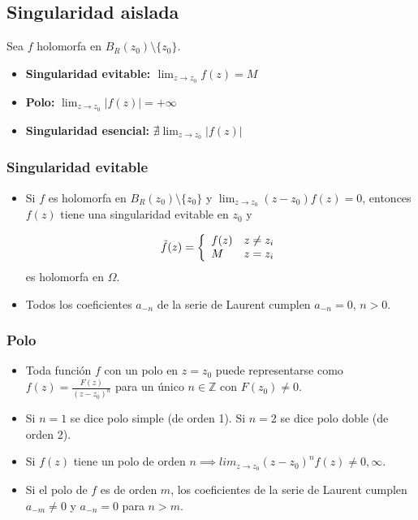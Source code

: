 \documentclass[paper=a4, fontsize=11pt]{scrartcl}
\numberwithin{equation}{section}
\numberwithin{figure}{section}
\numberwithin{table}{section}
\begin{document}
\subsection{Singularidad aislada}

Sea $f$ holomorfa en $B_R(z_0)\setminus\{z_0\}$.

\begin{itemize}

\item \textbf{Singularidad evitable: $\lim_{z\to z_0}f(z) = M$}
\item \textbf{Polo:} $\lim_{z\to z_0}|f(z)| = +\infty$
\item \textbf{Singularidad esencial:} $\nexists \lim_{z\to z_0}\left|f(z)\right|$
\end{itemize}

\subsubsection{Singularidad evitable}
\begin{itemize}
\item Si $f$ es holomorfa en $B_R(z_0)\setminus\{z_0\}$ y $\lim_{z\to z_0} (z-z_0)f(z) = 0$, entonces $f(z)$ tiene una singularidad evitable en $z_0$ y

$$ \tilde{f}(z) =
\left\{
\begin{array}{l l}
f(z) & z\neq z_i\\
M  & z=z_i
\end{array}
\right.$$
es holomorfa en $\Omega$.

\item Todos los coeficientes $a_{-n}$ de la serie de Laurent cumplen $a_{-n}=0$, $n>0$.
\end{itemize}


\subsubsection{Polo}
\begin{itemize}
\item Toda función $f$ con un polo en $z=z_0$ puede representarse como $f(z) = \frac{F(z)}{(z-z_0)^n}$ para un único $n\in \mathbb{Z}$ con $F(z_0)\neq 0$.

\item Si $n=1$ se dice polo simple (de orden 1). Si $n=2$ se dice polo doble (de orden 2).

\item Si $f(z)$ tiene un polo de orden $n \implies lim_{z\to z_0} (z-z_0)^nf(z) \neq 0, \infty$.

\item Si el polo de $f$ es de orden $m$, los coeficientes de la serie de Laurent cumplen $a_{-m}\neq0$ y $a_{-n}=0$ para $n>m$.
\end{itemize}
\end{document}
